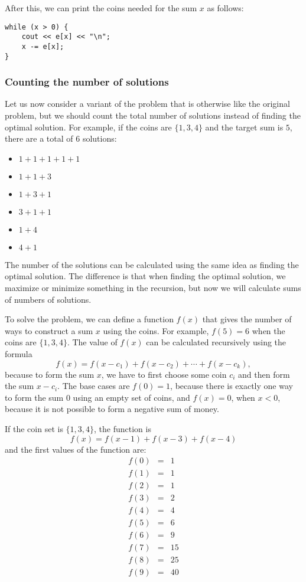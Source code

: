 After this, we can print the coins needed
for the sum $x$ as follows:

\begin{lstlisting}
while (x > 0) {
    cout << e[x] << "\n";
    x -= e[x];
}
\end{lstlisting}

\subsubsection{Counting the number of solutions}

Let us now consider a variant of the problem
that is otherwise like the original problem,
but we should count the total number of solutions instead
of finding the optimal solution.
For example, if the coins are $\{1,3,4\}$ and
the target sum is $5$,
there are a total of 6 solutions:

\begin{multicols}{2}
\begin{itemize}
\item $1+1+1+1+1$
\item $1+1+3$
\item $1+3+1$
\item $3+1+1$
\item $1+4$
\item $4+1$
\end{itemize}
\end{multicols}

The number of the solutions can be calculated
using the same idea as finding the optimal solution.
The difference is that when finding the optimal solution,
we maximize or minimize something in the recursion,
but now we will calculate sums of numbers of solutions.

To solve the problem, we can define a function $f(x)$
that gives the number of ways to construct
a sum $x$ using the coins.
For example, $f(5)=6$ when the coins are $\{1,3,4\}$.
The value of $f(x)$ can be calculated recursively
using the formula
\[ f(x) = f(x-c_1)+f(x-c_2)+\cdots+f(x-c_{k}),\]
because to form the sum $x$, we have to first
choose some coin $c_i$ and then form the sum $x-c_i$.
The base cases are $f(0)=1$, because there is exactly
one way to form the sum 0 using an empty set of coins,
and $f(x)=0$, when $x<0$, because it is not possible
to form a negative sum of money.

If the coin set is $\{1,3,4\}$, the function is
\[ f(x) = f(x-1)+f(x-3)+f(x-4) \]
and the first values of the function are:
\[
\begin{array}{lcl}
f(0) & = & 1 \\
f(1) & = & 1 \\
f(2) & = & 1 \\
f(3) & = & 2 \\
f(4) & = & 4 \\
f(5) & = & 6 \\
f(6) & = & 9 \\
f(7) & = & 15 \\
f(8) & = & 25 \\
f(9) & = & 40 \\
\end{array}
\]

